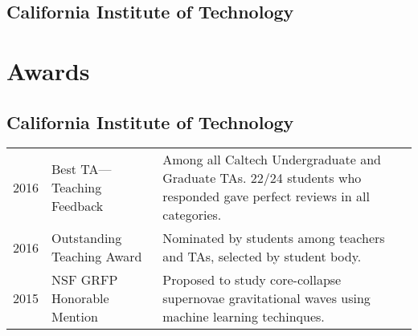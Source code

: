 \documentclass[]{yubo-resume-openfont}
\begin{document}
\begin{minipage}[t]{0.66\textwidth}
\subsection{California Institute of Technology}


\section{Awards}
\subsection{California Institute of Technology}
\begin{tabular}{p{20pt}p{80pt}p{7.5cm}}
    2016 & Best TA---Teaching Feedback & Among all Caltech Undergraduate and
    Graduate TAs. 22/24 students who responded gave perfect reviews in all
    categories.\\
    2016 & Outstanding Teaching Award & Nominated by students among teachers and
    TAs, selected by student body.\\
    2015 & NSF GRFP Honorable Mention & Proposed to study core-collapse
    supernovae gravitational waves using machine learning techinques.
\end{tabular}
\sectionsep

\end{minipage}
\end{document}
